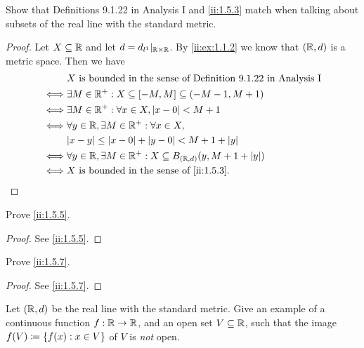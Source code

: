 \begin{ex}\label{ii:ex:1.5.1}
  Show that Definitions 9.1.22 in Analysis I and \cref{ii:1.5.3} match when talking about subsets of the real line with the standard metric.
\end{ex}

\begin{proof}
  Let \(X \subseteq \mathbb{R}\) and let \(d = d_{l^1}|_{\mathbb{R} \times \mathbb{R}}\).
  By \cref{ii:ex:1.1.2} we know that \((\mathbb{R}, d)\) is a metric space.
  Then we have
  \begin{align*}
         & X \text{ is bounded in the sense of Definition 9.1.22 in Analysis I}               \\
    \iff & \exists M \in \R^+ : X \subseteq [-M, M] \subseteq (-M - 1, M + 1)                 \\
    \iff & \exists M \in \R^+ : \forall x \in X, \abs{x - 0} < M + 1                          \\
    \iff & \forall y \in \R, \exists M \in \R^+ : \forall x \in X,                            \\
         & \abs{x - y} \leq \abs{x - 0} + \abs{y - 0} < M + 1 + \abs{y}                       \\
    \iff & \forall y \in \R, \exists M \in \R^+ : X \subseteq B_{(\R, d)}(y, M + 1 + \abs{y}) \\
    \iff & X \text{ is bounded in the sense of \cref{ii:1.5.3}}.
  \end{align*}
\end{proof}

\begin{ex}\label{ii:ex:1.5.2}
  Prove \cref{ii:1.5.5}.
\end{ex}

\begin{proof}
  See \cref{ii:1.5.5}.
\end{proof}

\begin{ex}\label{ii:ex:1.5.3}
  Prove \cref{ii:1.5.7}.
\end{ex}

\begin{proof}
  See \cref{ii:1.5.7}.
\end{proof}

\begin{ex}\label{ii:ex:1.5.4}
  Let \((\mathbb{R}, d)\) be the real line with the standard metric.
  Give an example of a continuous function \(f : \mathbb{R} \to \mathbb{R}\), and an open set \(V \subseteq \mathbb{R}\), such that the image \(f(V) \coloneqq \left\lbrace f(x) : x \in V\right\rbrace\) of \(V\) is \emph{not} open.
\end{ex}

